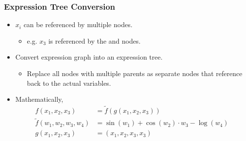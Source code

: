 \begin{frame}
\frametitle{Expression Tree Conversion}
\begin{itemize}
\item $x_i$ can be referenced by multiple nodes.
    \begin{itemize}
        \item e.g. $x_3$ is referenced by the \code{*} and  nodes.
    \end{itemize}

\item Convert expression graph into an expression tree.
    \begin{itemize}
        \item Replace all nodes with multiple parents as separate nodes 
            that reference back to the actual variables.
    \end{itemize}

\item Mathematically,
\begin{align}
    f(x_1, x_2, x_3) &= \tilde{f}(g(x_1, x_2, x_3)) \label{eq:f-tree-example} \\
    \tilde{f}(w_1, w_2, w_3, w_4) &= \sin(w_1) + \cos(w_2) \cdot w_3 - \log(w_4) \nonumber \\
    g(x_1, x_2, x_3) &= (x_1, x_2, x_3, x_3) \nonumber
\end{align}

\end{itemize}
\end{frame}

